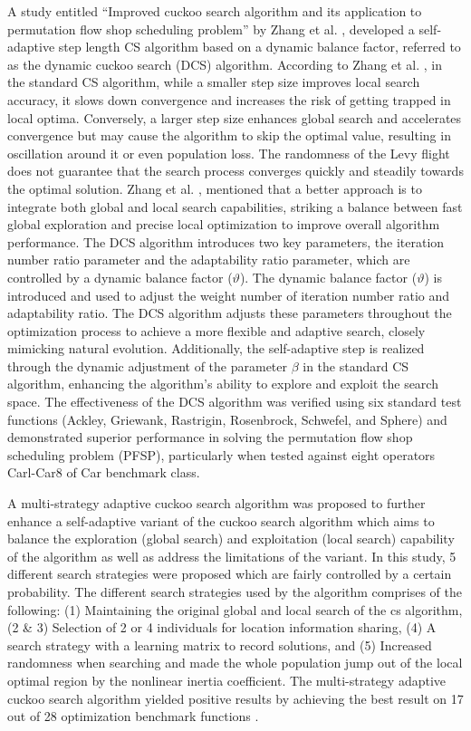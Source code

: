 A study entitled “Improved cuckoo search algorithm and its application to permutation flow shop scheduling problem” by Zhang et al. \cite{zhang2020improved}, developed a self-adaptive step length CS algorithm based on a dynamic balance factor, referred to as the dynamic cuckoo search (DCS) algorithm. According to Zhang et al. \cite{zhang2020improved}, in the standard CS algorithm, while a smaller step size improves local search accuracy, it slows down convergence and increases the risk of getting trapped in local optima. Conversely, a larger step size enhances global search and accelerates convergence but may cause the algorithm to skip the optimal value, resulting in oscillation around it or even population loss. The randomness of the Levy flight does not guarantee that the search process converges quickly and steadily towards the optimal solution. Zhang et al. \cite{zhang2020improved}, mentioned that a better approach is to integrate both global and local search capabilities, striking a balance between fast global exploration and precise local optimization to improve overall algorithm performance. The DCS algorithm introduces two key parameters, the iteration number ratio parameter and the adaptability ratio parameter, which are controlled by a dynamic balance factor ($\vartheta$). The dynamic balance factor ($\vartheta$) is introduced and used to adjust the weight number of iteration number ratio and adaptability ratio. The DCS algorithm adjusts these parameters throughout the optimization process to achieve a more flexible and adaptive search, closely mimicking natural evolution. Additionally, the self-adaptive step is realized through the dynamic adjustment of the parameter $\beta$ in the standard CS algorithm, enhancing the algorithm’s ability to explore and exploit the search space. The effectiveness of the DCS algorithm was verified using six standard test functions (Ackley, Griewank, Rastrigin, Rosenbrock, Schwefel, and Sphere) and demonstrated superior performance in solving the permutation flow shop scheduling problem (PFSP), particularly when tested against eight operators Carl-Car8 of Car benchmark class.

A multi-strategy adaptive cuckoo search algorithm was proposed to further enhance a self-adaptive variant of the cuckoo search algorithm which aims to balance the exploration (global search) and exploitation (local search) capability of the algorithm as well as address the limitations of the variant. In this study, 5 different search strategies were proposed which are fairly controlled by a certain probability. The different search strategies used by the algorithm comprises of the following: (1) Maintaining the original global and local search of the cs algorithm, (2 \& 3) Selection of 2 or 4 individuals for location information sharing, (4) A search strategy with a learning matrix to record solutions, and (5) Increased randomness when searching and made the whole population jump out of the local optimal region by the nonlinear inertia coefficient. The multi-strategy adaptive cuckoo search algorithm yielded positive results by achieving the best result on 17 out of 28 optimization benchmark functions \cite{gao2021adaptive}.

